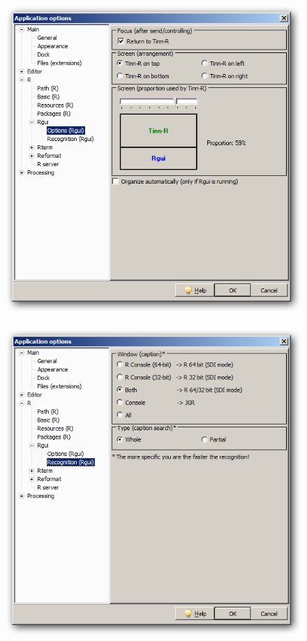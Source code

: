 \begin{figure}[h!]
  \includegraphics[scale=0.35]{./res/app_r_rgui_options.png}~~
  \includegraphics[scale=0.35]{./res/app_r_rgui_recognition.png}\\

\end{figure}
